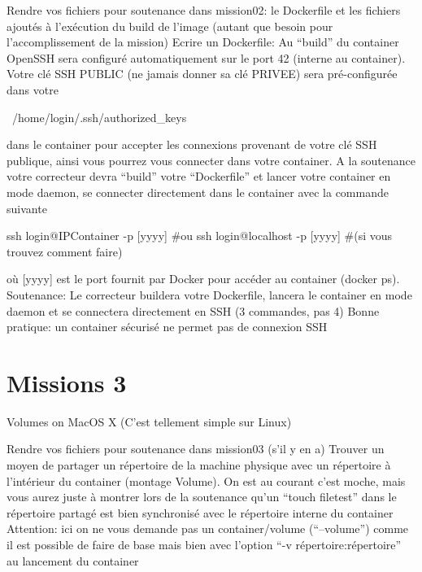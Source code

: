 \documentclass{42}
\begin{document}
Rendre vos fichiers pour soutenance dans mission02: le Dockerfile et les fichiers ajoutés à l’exécution du build de l’image (autant que besoin pour l’accomplissement de la mission)
\newline
\newline
Ecrire un Dockerfile:
Au “build” du container OpenSSH sera configuré automatiquement sur le port 42 (interne au container).
\newline
Votre clé SSH PUBLIC (ne jamais donner sa clé PRIVEE) sera pré-configurée dans votre
\begin{42ccode}
~/home/login/.ssh/authorized_keys
\end{42ccode}
dans le container pour accepter les connexions provenant de votre clé SSH publique, ainsi vous pourrez vous connecter dans votre container.
\newline
\newline
A la soutenance votre correcteur devra “build” votre “Dockerfile” et lancer votre container en mode daemon, se connecter directement dans le container avec la commande suivante
\begin{42ccode}
ssh login@IPContainer -p [yyyy] #ou
ssh login@localhost -p [yyyy] #(si vous trouvez comment faire)
\end{42ccode}
où [yyyy] est le port fournit par Docker pour accéder au container (docker ps).
\newline
\newline
Soutenance:
\newline
Le correcteur buildera votre Dockerfile, lancera le container en mode daemon et se connectera directement en SSH (3 commandes, pas 4)
\newline
\newline
\info
{
	Bonne pratique: un container sécurisé ne permet pas de connexion SSH
}

\newpage

\section{Missions 3}
{\Huge Volumes on MacOS X (C’est tellement simple sur Linux)}
\newline
\newline

Rendre vos fichiers pour soutenance dans mission03 (s’il y en a)
\newline
\newline
Trouver un moyen de partager un répertoire de la machine physique avec un répertoire à l'intérieur du container (montage Volume).
On est au courant c’est moche, mais vous aurez juste à montrer lors de la soutenance qu’un 
“touch filetest”
dans le répertoire partagé est bien synchronisé avec le répertoire interne du container
\newline
\newline
Attention: ici on ne vous demande pas un container/volume (“--volume”) comme il est possible de faire de base mais bien avec l’option “-v répertoire:répertoire” au lancement du container
\end{document}
